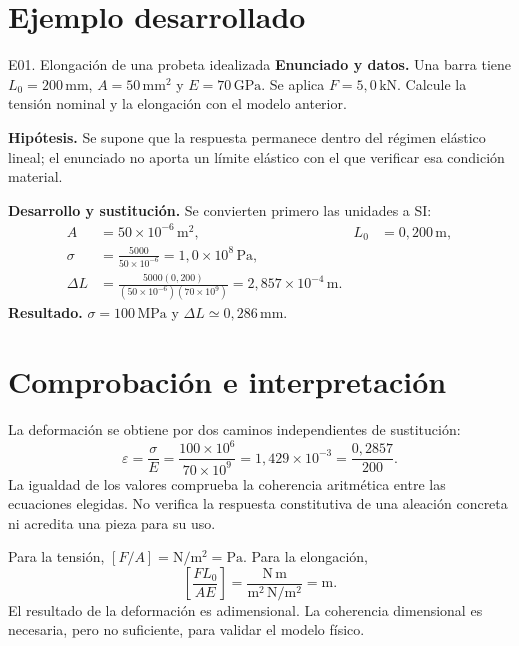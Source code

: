 \section{Ejemplo desarrollado}
\begin{studiumworked}{E01. Elongación de una probeta idealizada}
\textbf{Enunciado y datos.} Una barra tiene $L_0=200\,\mathrm{mm}$, $A=50\,\mathrm{mm^2}$ y $E=70\,\mathrm{GPa}$. Se aplica $F=5{,}0\,\mathrm{kN}$. Calcule la tensión nominal y la elongación con el modelo anterior.

\textbf{Hipótesis.} Se supone que la respuesta permanece dentro del régimen elástico lineal; el enunciado no aporta un límite elástico con el que verificar esa condición material.

\textbf{Desarrollo y sustitución.} Se convierten primero las unidades a SI:
\begin{align*}
 A&=50\times10^{-6}\,\mathrm{m^2},&L_0&=0{,}200\,\mathrm{m},\\
 \sigma&=\frac{5000}{50\times10^{-6}}=1{,}0\times10^8\,\mathrm{Pa},\\
 \Delta L&=\frac{5000(0{,}200)}{(50\times10^{-6})(70\times10^9)}
 =2{,}857\times10^{-4}\,\mathrm{m}.
\end{align*}
\textbf{Resultado.} $\sigma=100\,\mathrm{MPa}$ y $\Delta L\simeq0{,}286\,\mathrm{mm}$.
\end{studiumworked}

\clearpage
\section{Comprobación e interpretación}
La deformación se obtiene por dos caminos independientes de sustitución:
\begin{equation}
\varepsilon=\frac{\sigma}{E}=\frac{100\times10^6}{70\times10^9}
=1{,}429\times10^{-3}=\frac{0{,}2857}{200}.
\label{eq:check}
\end{equation}
La igualdad de los valores comprueba la coherencia aritmética entre las ecuaciones elegidas. No verifica la respuesta constitutiva de una aleación concreta ni acredita una pieza para su uso.

\begin{tcolorbox}[studiumcommon,colback=studiumCheckBack,colframe=studiumCheckFrame,colbacktitle=studiumCheckFrame,coltitle=white,title={Comprobación dimensional}]
Para la tensión, $[F/A]=\mathrm{N/m^2}=\mathrm{Pa}$. Para la elongación,
\[
\left[\frac{FL_0}{AE}\right]
=\frac{\mathrm{N}\,\mathrm{m}}{\mathrm{m^2}\,\mathrm{N/m^2}}=\mathrm{m}.
\]
El resultado de la deformación es adimensional. La coherencia dimensional es necesaria, pero no suficiente, para validar el modelo físico.
\end{tcolorbox}

